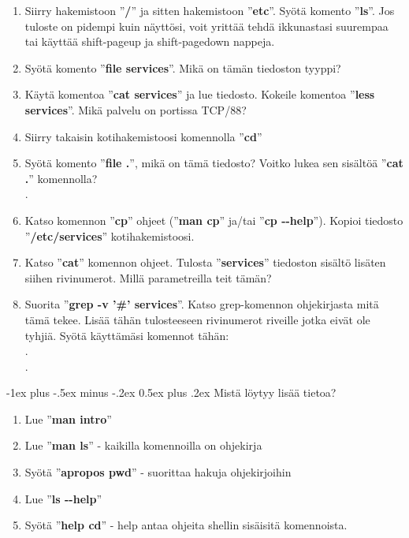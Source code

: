 \documentclass[12pt,portrait,a4]{article}
\makeatletter
\renewcommand{\section}{\@startsection{section}{1}{0mm}%
                                {-1ex plus -.5ex minus -.2ex}%
                                {0.5ex plus .2ex}%
                                {\normalfont\large\bfseries}}
\makeatother
\begin{document}
\begin{enumerate}

\item Siirry hakemistoon ''\textbf{/}'' ja sitten hakemistoon ''\textbf{etc}''.  Syötä komento
''\textbf{ls}''.  Jos tuloste on pidempi kuin näyttösi, voit yrittää tehdä
ikkunastasi suurempaa tai käyttää shift-pageup ja shift-pagedown nappeja.

\item Syötä komento ''\textbf{file services}''.  Mikä on tämän tiedoston
tyyppi?  \hrulefill

\item Käytä komentoa ''\textbf{cat services}'' ja lue tiedosto.  Kokeile
komentoa ''\textbf{less services}''.  Mikä palvelu on portissa TCP/88? 
\hrulefill

\item Siirry takaisin kotihakemistoosi komennolla ''\textbf{cd}''

\item Syötä komento ''\textbf{file .}'', mikä on tämä tiedosto?  Voitko lukea sen sisältöä
''\textbf{cat .}'' komennolla? \\ . \hrulefill

\item Katso komennon ''\textbf{cp}'' ohjeet (''\textbf{man cp}'' ja/tai
''\textbf{cp -{}-help}'').  Kopioi tiedosto ''\textbf{/etc/services}''
kotihakemistoosi.

\item Katso ''\textbf{cat}'' komennon ohjeet.  Tulosta ''\textbf{services}'' tiedoston sisältö
lisäten siihen rivinumerot.  Millä parametreilla teit tämän? \hrulefill

\item Suorita ''\textbf{grep -v '\#' services}''.  Katso grep-komennon ohjekirjasta mitä
tämä tekee.  Lisää tähän tulosteeseen rivinumerot riveille jotka eivät ole
tyhjiä.  Syötä käyttämäsi komennot tähän: \\ . \hrulefill \\ . \hrulefill

\end{enumerate}

\section{Mistä löytyy lisää tietoa?}

\begin{enumerate}
\item Lue ''\textbf{man intro}''

\item Lue ''\textbf{man ls}'' - kaikilla komennoilla on ohjekirja

\item Syötä ''\textbf{apropos pwd}'' - suorittaa hakuja ohjekirjoihin

\item Lue ''\textbf{ls -{}-help}''

\item Syötä ''\textbf{help cd}'' - help antaa ohjeita shellin sisäisitä
komennoista.
\end{enumerate}
\end{document}
